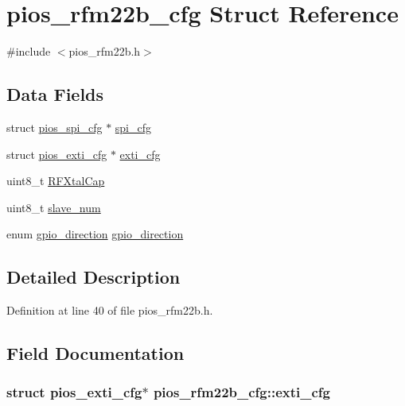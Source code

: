 \hypertarget{structpios__rfm22b__cfg}{\section{pios\-\_\-rfm22b\-\_\-cfg \-Struct \-Reference}
\label{structpios__rfm22b__cfg}
}


{\ttfamily \#include $<$pios\-\_\-rfm22b.\-h$>$}

\subsection*{\-Data \-Fields}
\begin{DoxyCompactItemize}
\item 
struct \hyperlink{structpios__spi__cfg}{pios\-\_\-spi\-\_\-cfg} $\ast$ \hyperlink{structpios__rfm22b__cfg_aa6c10909092b21bbdec314781785bf5d}{spi\-\_\-cfg}
\item 
struct \hyperlink{structpios__exti__cfg}{pios\-\_\-exti\-\_\-cfg} $\ast$ \hyperlink{structpios__rfm22b__cfg_af86691ce02d622888addd9f0474ef4ec}{exti\-\_\-cfg}
\item 
uint8\-\_\-t \hyperlink{structpios__rfm22b__cfg_a20784354b27515bed19c3fa02b880a10}{\-R\-F\-Xtal\-Cap}
\item 
uint8\-\_\-t \hyperlink{structpios__rfm22b__cfg_a71f36f077e13645e984cb88f10e2fa0e}{slave\-\_\-num}
\item 
enum \hyperlink{group___p_i_o_s___r_f_m22_b_gaccc7d029df9e5a96151a68e64f4be7e2}{gpio\-\_\-direction} \hyperlink{structpios__rfm22b__cfg_ac8a55d600d26585b2fb4d58c4e197f9b}{gpio\-\_\-direction}
\end{DoxyCompactItemize}


\subsection{\-Detailed \-Description}


\-Definition at line 40 of file pios\-\_\-rfm22b.\-h.



\subsection{\-Field \-Documentation}
\hypertarget{structpios__rfm22b__cfg_af86691ce02d622888addd9f0474ef4ec}{
\subsubsection[{exti\-\_\-cfg}]{\setlength{\rightskip}{0pt plus 5cm}struct {\bf pios\-\_\-exti\-\_\-cfg}$\ast$ {\bf pios\-\_\-rfm22b\-\_\-cfg\-::exti\-\_\-cfg}}}\label{structpios__rfm22b__cfg_af86691ce02d622888addd9f0474ef4ec}


